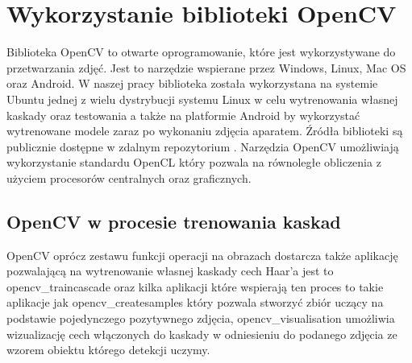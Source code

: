 \section{Wykorzystanie biblioteki OpenCV}\label{sec:opencv}
Biblioteka OpenCV to otwarte oprogramowanie, które jest wykorzystywane do przetwarzania zdjęć. Jest to narzędzie wspierane przez Windows, Linux, Mac OS oraz Android. W naszej pracy biblioteka została wykorzystana na systemie Ubuntu jednej z wielu dystrybucji systemu Linux w celu wytrenowania własnej kaskady oraz testowania a także na platformie Android by wykorzystać wytrenowane modele zaraz po wykonaniu zdjęcia aparatem. Źródła biblioteki są publicznie dostępne w zdalnym repozytorium \cite{OpenCVSource}. Narzędzia OpenCV umożliwiają wykorzystanie standardu OpenCL który pozwala na równoległe obliczenia z użyciem procesorów centralnych oraz graficznych.


\subsection{OpenCV w procesie trenowania kaskad}

OpenCV oprócz zestawu funkcji operacji na obrazach dostarcza także aplikację pozwalającą na wytrenowanie własnej kaskady cech Haar’a jest to opencv\_traincascade oraz kilka aplikacji które wspierają ten proces to takie aplikacje jak opencv\_createsamples który pozwala stworzyć zbiór uczący na podstawie pojedynczego pozytywnego zdjęcia, opencv\_visualisation umożliwia wizualizację cech włączonych do kaskady w odniesieniu do podanego zdjęcia ze wzorem obiektu którego detekcji uczymy.

